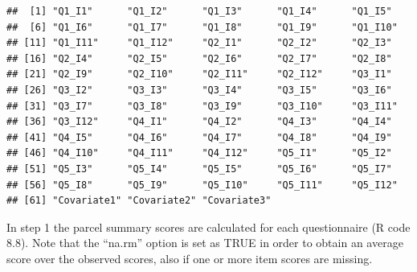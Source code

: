 \documentclass[
]{book}
\begin{document}
\begin{verbatim}
##  [1] "Q1_I1"      "Q1_I2"      "Q1_I3"      "Q1_I4"      "Q1_I5"     
##  [6] "Q1_I6"      "Q1_I7"      "Q1_I8"      "Q1_I9"      "Q1_I10"    
## [11] "Q1_I11"     "Q1_I12"     "Q2_I1"      "Q2_I2"      "Q2_I3"     
## [16] "Q2_I4"      "Q2_I5"      "Q2_I6"      "Q2_I7"      "Q2_I8"     
## [21] "Q2_I9"      "Q2_I10"     "Q2_I11"     "Q2_I12"     "Q3_I1"     
## [26] "Q3_I2"      "Q3_I3"      "Q3_I4"      "Q3_I5"      "Q3_I6"     
## [31] "Q3_I7"      "Q3_I8"      "Q3_I9"      "Q3_I10"     "Q3_I11"    
## [36] "Q3_I12"     "Q4_I1"      "Q4_I2"      "Q4_I3"      "Q4_I4"     
## [41] "Q4_I5"      "Q4_I6"      "Q4_I7"      "Q4_I8"      "Q4_I9"     
## [46] "Q4_I10"     "Q4_I11"     "Q4_I12"     "Q5_I1"      "Q5_I2"     
## [51] "Q5_I3"      "Q5_I4"      "Q5_I5"      "Q5_I6"      "Q5_I7"     
## [56] "Q5_I8"      "Q5_I9"      "Q5_I10"     "Q5_I11"     "Q5_I12"    
## [61] "Covariate1" "Covariate2" "Covariate3"
\end{verbatim}

In step 1 the parcel summary scores are calculated for each questionnaire (R code 8.8). Note that the ``na.rm'' option is set as TRUE in order to obtain an average score over the observed scores, also if one or more item scores are missing.
\end{document}
